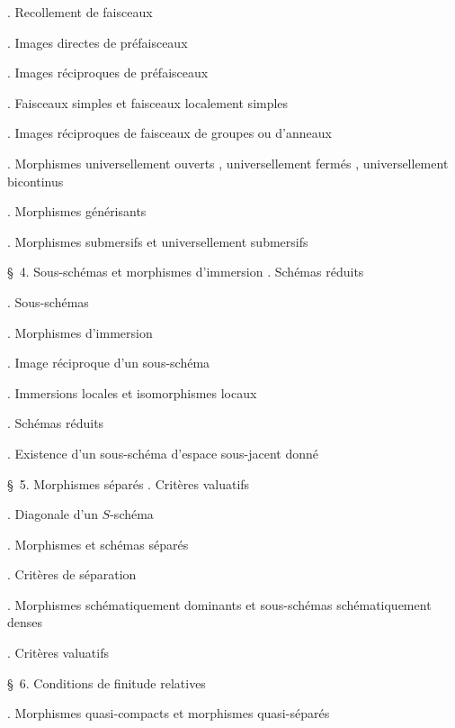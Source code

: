 \noindent{}. Recollement de faisceaux\dotfill

\noindent{}. Images directes de préfaisceaux\dotfill

\noindent{}. Images réciproques de préfaisceaux\dotfill

\noindent{}. Faisceaux simples et faisceaux localement simples\dotfill

\noindent{}. Images réciproques de faisceaux de groupes ou d'anneaux\dotfill


\noindent{}. Morphismes universellement ouverts , universellement fermés , universellement bicontinus\dotfill

\noindent{}. Morphismes générisants\dotfill

\noindent{}. Morphismes submersifs et universellement submersifs

\noindent\quad \S\ 4. Sous-schémas et morphismes d'immersion . Schémas réduits\dotfill

\noindent{}. Sous-schémas\dotfill

\noindent{}. Morphismes d'immersion\dotfill

\noindent{}. Image réciproque d'un sous-schéma\dotfill

\noindent{}. Immersions locales et isomorphismes locaux\dotfill

\noindent{}. Schémas réduits\dotfill

\noindent{}. Existence d'un sous-schéma d'espace sous-jacent donné\dotfill

\noindent\quad \S\ 5. Morphismes séparés . Critères valuatifs\dotfill

\noindent{}. Diagonale d'un $S$-schéma\dotfill

\noindent{}. Morphismes et schémas séparés\dotfill

\noindent{}. Critères de séparation\dotfill

\noindent{}. Morphismes schématiquement dominants et sous-schémas schématiquement denses\dotfill

\noindent{}. Critères valuatifs\dotfill

\noindent\quad \S\ 6. Conditions de finitude relatives\dotfill

\noindent{}. Morphismes quasi-compacts et morphismes quasi-séparés\dotfill

